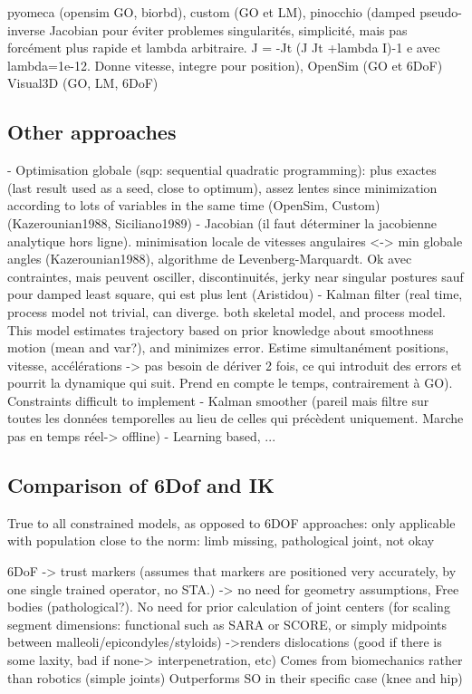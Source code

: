 pyomeca (opensim GO, biorbd), 
custom (GO et LM), 
pinocchio (damped pseudo-inverse Jacobian pour éviter problemes singularités, simplicité, mais pas forcément plus rapide et lambda arbitraire. J = -Jt (J Jt +lambda I)-1 e avec lambda=1e-12. Donne vitesse, integre pour position), 
OpenSim (GO et 6DoF)
Visual3D (GO, LM, 6DoF)






\subsection{Other approaches}

\cite{DeGroote2008,Aristidou2017}
- Optimisation globale (sqp: sequential quadratic programming): plus exactes (last result used as a seed, close to optimum), assez lentes since minimization according to lots of variables in the same time (OpenSim, Custom) (Kazerounian1988, Siciliano1989)
- Jacobian (il faut déterminer la jacobienne analytique hors ligne). minimisation locale de vitesses angulaires <-> min globale angles (Kazerounian1988), algorithme de Levenberg-Marquardt. Ok avec contraintes, mais peuvent osciller, discontinuités, jerky near singular postures sauf pour damped least square, qui est plus lent (Aristidou)
- Kalman filter (real time, process model not trivial, can diverge. both skeletal model, and process model. This model estimates trajectory based on prior knowledge about smoothness motion (mean and var?), and minimizes error. Estime simultanément positions, vitesse, accélérations -> pas besoin de dériver 2 fois, ce qui introduit des errors et pourrit la dynamique qui suit. Prend en compte le temps, contrairement à GO). Constraints difficult to implement
- Kalman smoother (pareil mais filtre sur toutes les données temporelles au lieu de celles qui précèdent uniquement. Marche pas en temps réel-> offline)
- Learning based, ...


 





\subsection{Comparison of 6Dof and IK}

True to all constrained models, as opposed to 6DOF approaches: only applicable with population close to the norm: limb missing, pathological joint, not okay

6DoF
-> trust markers (assumes that markers are positioned very accurately, by one single trained operator, no STA.)
-> no need for geometry assumptions, Free bodies (pathological?). No need for prior calculation of joint centers (for scaling segment dimensions: functional such as SARA or SCORE, or simply midpoints between malleoli/epicondyles/styloids)
->renders dislocations (good if there is some laxity, bad if none-> interpenetration, etc) Comes from biomechanics rather than robotics (simple joints)
Outperforms SO in their specific case (knee and hip) \cite{Lu1999}


